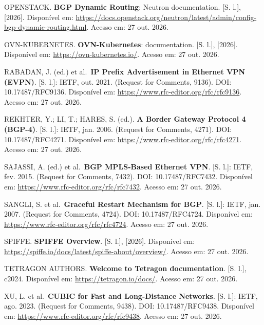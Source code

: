 \documentclass[12pt,openany,oneside,a4paper,chapter=TITLE,english,brazil]{abntex2}
\newenvironment{referenciasabnt}
  {\begin{flushleft}\SingleSpacing\setlength{\parindent}{0pt}\setlength{\parskip}{\baselineskip}}
  {\end{flushleft}}
\begin{document}
\begin{referenciasabnt}
OPENSTACK. \textbf{BGP Dynamic Routing}: Neutron documentation. {[}S. l.{]}, {[}2026{]}. Disponível em: \url{https://docs.openstack.org/neutron/latest/admin/config-bgp-dynamic-routing.html}. Acesso em: 27 out. 2026.

OVN-KUBERNETES. \textbf{OVN-Kubernetes}: documentation. {[}S. l.{]}, {[}2026{]}. Disponível em: \url{https://ovn-kubernetes.io/}. Acesso em: 27 out. 2026.

RABADAN, J. (ed.) et al.~\textbf{IP Prefix Advertisement in Ethernet VPN (EVPN)}. {[}S. l.{]}: IETF, out. 2021. (Request for Comments, 9136). DOI: 10.17487/RFC9136. Disponível em: \url{https://www.rfc-editor.org/rfc/rfc9136}. Acesso em: 27 out. 2026.

REKHTER, Y.; LI, T.; HARES, S. (ed.). \textbf{A Border Gateway Protocol 4 (BGP-4)}. {[}S. l.{]}: IETF, jan. 2006. (Request for Comments, 4271). DOI: 10.17487/RFC4271. Disponível em: \url{https://www.rfc-editor.org/rfc/rfc4271}. Acesso em: 27 out. 2026.

SAJASSI, A. (ed.) et al.~\textbf{BGP MPLS-Based Ethernet VPN}. {[}S. l.{]}: IETF, fev. 2015. (Request for Comments, 7432). DOI: 10.17487/RFC7432. Disponível em: \url{https://www.rfc-editor.org/rfc/rfc7432}. Acesso em: 27 out. 2026.

SANGLI, S. et al.~\textbf{Graceful Restart Mechanism for BGP}. {[}S. l.{]}: IETF, jan. 2007. (Request for Comments, 4724). DOI: 10.17487/RFC4724. Disponível em: \url{https://www.rfc-editor.org/rfc/rfc4724}. Acesso em: 27 out. 2026.

SPIFFE. \textbf{SPIFFE Overview}. {[}S. l.{]}, {[}2026{]}. Disponível em: \url{https://spiffe.io/docs/latest/spiffe-about/overview/}. Acesso em: 27 out. 2026.

TETRAGON AUTHORS. \textbf{Welcome to Tetragon documentation}. {[}S. l.{]}, c2024. Disponível em: \url{https://tetragon.io/docs/}. Acesso em: 27 out. 2026.

XU, L. et al.~\textbf{CUBIC for Fast and Long-Distance Networks}. {[}S. l.{]}: IETF, ago. 2023. (Request for Comments, 9438). DOI: 10.17487/RFC9438. Disponível em: \url{https://www.rfc-editor.org/rfc/rfc9438}. Acesso em: 27 out. 2026.

\end{referenciasabnt}
\end{document}
